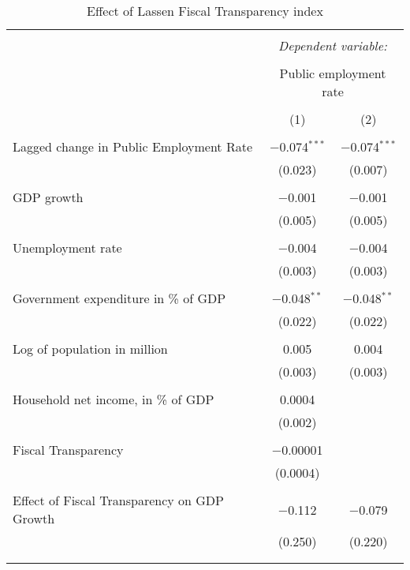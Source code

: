 
\begin{table}[!htbp] \centering 
  \caption{Effect of Lassen Fiscal Transparency index} 
  \label{} 
\begin{tabular}{@{\extracolsep{5pt}}lcc} 
\\[-1.8ex]\hline 
\hline \\[-1.8ex] 
 & \multicolumn{2}{c}{\textit{Dependent variable:}} \\ 
\cline{2-3} 
\\[-1.8ex] & \multicolumn{2}{c}{Public employment rate} \\ 
\\[-1.8ex] & (1) & (2)\\ 
\hline \\[-1.8ex] 
 Lagged change in Public Employment Rate & $-$0.074$^{***}$ & $-$0.074$^{***}$ \\ 
  & (0.023) & (0.007) \\ 
  & & \\ 
 GDP growth & $-$0.001 & $-$0.001 \\ 
  & (0.005) & (0.005) \\ 
  & & \\ 
 Unemployment rate & $-$0.004 & $-$0.004 \\ 
  & (0.003) & (0.003) \\ 
  & & \\ 
 Government expenditure in \% of GDP & $-$0.048$^{**}$ & $-$0.048$^{**}$ \\ 
  & (0.022) & (0.022) \\ 
  & & \\ 
 Log of population in million & 0.005 & 0.004 \\ 
  & (0.003) & (0.003) \\ 
  & & \\ 
 Household net income, in \% of GDP & 0.0004 &  \\ 
  & (0.002) &  \\ 
  & & \\ 
 Fiscal Transparency & $-$0.00001 &  \\ 
  & (0.0004) &  \\ 
  & & \\ 
 Effect of Fiscal Transparency on GDP Growth & $-$0.112 & $-$0.079 \\ 
  & (0.250) & (0.220) \\ 
  & & \\ 
\hline \\[-1.8ex] 

\end{tabular}
\end{table}

